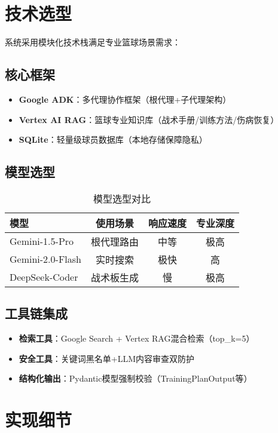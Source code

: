 \documentclass{article}
\theoremstyle{plain}
\theoremstyle{definition}
\theoremstyle{remark}
\begin{document}
\section{技术选型}
系统采用模块化技术栈满足专业篮球场景需求：

\subsection{核心框架}
\begin{itemize}
    \item \textbf{Google ADK}：多代理协作框架（根代理+子代理架构）
    \item \textbf{Vertex AI RAG}：篮球专业知识库（战术手册/训练方法/伤病恢复）
    \item \textbf{SQLite}：轻量级球员数据库（本地存储保障隐私）
\end{itemize}

\subsection{模型选型}
\begin{table}[h]
\caption{模型选型对比}
\label{model-selection}
\centering
\begin{tabular}{lccc}
\toprule
模型 & 使用场景 & 响应速度 & 专业深度 \\
\midrule
Gemini-1.5-Pro & 根代理路由 & 中等 & 极高 \\
Gemini-2.0-Flash & 实时搜索 & 极快 & 高 \\
DeepSeek-Coder & 战术板生成 & 慢 & 极高 \\
\bottomrule
\end{tabular}
\end{table}

\subsection{工具链集成}
\begin{itemize}
    \item \textbf{检索工具}：Google Search + Vertex RAG混合检索（top\_k=5）
    \item \textbf{安全工具}：关键词黑名单+LLM内容审查双防护
    \item \textbf{结构化输出}：Pydantic模型强制校验（TrainingPlanOutput等）
\end{itemize}

\section{实现细节}
\end{document}
